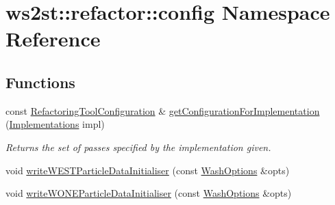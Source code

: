 \hypertarget{namespacews2st_1_1refactor_1_1config}{}\section{ws2st\+:\+:refactor\+:\+:config Namespace Reference}
\label{namespacews2st_1_1refactor_1_1config}
\subsection*{Functions}
\begin{DoxyCompactItemize}
\item 
const \mbox{\hyperlink{classws2st_1_1refactor_1_1RefactoringToolConfiguration}{Refactoring\+Tool\+Configuration}} \& \mbox{\hyperlink{namespacews2st_1_1refactor_1_1config_a0fc0edc6c85a212d9a53d019ac66844d}{get\+Configuration\+For\+Implementation}} (\mbox{\hyperlink{common_8hpp_aad9d1428f17c06ff77ef15dea22624dc}{Implementations}} impl)
\begin{DoxyCompactList}\small\item\em Returns the set of passes specified by the implementation given. \end{DoxyCompactList}\item 
void \mbox{\hyperlink{namespacews2st_1_1refactor_1_1config_afe16d771b484da1d613e8441ff31b634}{write\+W\+E\+S\+T\+Particle\+Data\+Initialiser}} (const \mbox{\hyperlink{structWashOptions}{Wash\+Options}} \&opts)
\item 
void \mbox{\hyperlink{namespacews2st_1_1refactor_1_1config_a315ab1f03952a8b64749290fd76378d6}{write\+W\+O\+N\+E\+Particle\+Data\+Initialiser}} (const \mbox{\hyperlink{structWashOptions}{Wash\+Options}} \&opts)
\end{DoxyCompactItemize}
